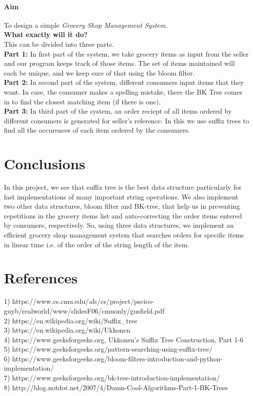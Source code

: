 \documentclass[11pt,a4paper]{article}
\begin{document}
\paragraph{Aim}
To design a simple \emph{Grocery Shop Management System}.
\\
\textbf{What exactly will it do?}
\\
This can be divided into three parts.
\\
\textbf{Part 1:} In first part of the system, we take grocery items as input from the seller and our program keeps track of those items. The set of items maintained will each be unique, and we keep sure of that using the bloom filter.
\\
\textbf{Part 2:} In second part of the system, different consumers input items that they want. In case, the consumer makes a spelling mistake, there the BK Tree comes in to find the closest matching item (if there is one). 
\\
\textbf{Part 3:} In third part of the system, an order reciept of all items ordered by different consumers is generated for seller's reference. In this we use suffix trees to find all the occurences of each item ordered by the consumers.

\section{Conclusions}
\color{black}
In this project, we see that suffix tree is the best data structure particularly for fast implementations of many important string operations. We also implement two other data structures, bloom filter and BK-tree, that help us in preventing repetitions in the grocery items list and auto-correcting the order items entered by consumers, respectively. So, using three data structures, we implement an efficient grocery shop management system that searches orders for specific items in linear time i.e. of the order of the string length of the item.

\section{References}
\label{sec:refrnces}
1) https://www.cs.cmu.edu/afs/cs/project/pscico-guyb/realworld/www/slidesF06/cmuonly/gusfield.pdf
\\
2) https://en.wikipedia.org/wiki/Suffix\_tree
\\
3) https://en.wikipedia.org/wiki/Ukkonen
\\
4) https://www.geeksforgeeks.org, Ukkonen's Suffix Tree Construction, Part 1-6
\\
5) https://www.geeksforgeeks.org/pattern-searching-using-suffix-tree/
\\
6) https://www.geeksforgeeks.org/bloom-filters-introduction-and-python-implementation/
\\
7) https://www.geeksforgeeks.org/bk-tree-introduction-implementation/
\\
8) http://blog.notdot.net/2007/4/Damn-Cool-Algorithms-Part-1-BK-Trees
\\
\end{document}
